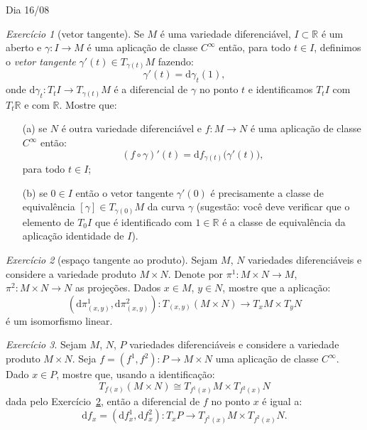 \documentclass[oneside,11pt]{amsart}
\newcommand{\R}{\mathds R}
\newcommand{\dd}{\mathrm d}
\theoremstyle{remark}\newtheorem{exercise}{Exercício}[section]
\theoremstyle{plain}\newtheorem{teo}{Teorema}[section]
\theoremstyle{plain}\newtheorem{lem}[teo]{Lema}
\theoremstyle{plain}\newtheorem{prop}[teo]{Proposição}
\theoremstyle{definition}\newtheorem{defin}[teo]{Definição}
\theoremstyle{remark}\newtheorem{rem}[teo]{Observação}
\theoremstyle{definition}\newtheorem{example}[teo]{Exemplo}
\numberwithin{equation}{section}
\begin{document}
\begin{section}{Dia 16/08}
\begin{exercise}[vetor tangente]
Se $M$ é uma variedade diferenciável, $I\subset\R$ é um aberto e $\gamma:I\to M$ é uma aplicação de classe $C^\infty$
então, para todo $t\in I$, definimos o {\em vetor tangente\/} $\gamma'(t)\in T_{\gamma(t)}M$ fazendo:
\[\gamma'(t)=\dd\gamma_t(1),\]
onde $\dd\gamma_t:T_tI\to T_{\gamma(t)}M$ é a diferencial de $\gamma$ no ponto $t$ e identificamos $T_tI$ com $T_t\R$ e
com $\R$. Mostre que:
\begin{itemize}
\item[(a)] se $N$ é outra variedade diferenciável e $f:M\to N$ é uma aplicação de classe $C^\infty$ então:
\[(f\circ\gamma)'(t)=\dd f_{\gamma(t)}\big(\gamma'(t)\big),\]
para todo $t\in I$;
\item[(b)] se $0\in I$ então o vetor tangente $\gamma'(0)$ é precisamente a classe de equivalência
$[\gamma]\in T_{\gamma(0)}M$ da curva $\gamma$ (sugestão: você deve verificar que o elemento de $T_0I$ que é identificado
com $1\in\R$ é a classe de equivalência da aplicação identidade de $I$).
\end{itemize}
\end{exercise}

\begin{exercise}[espaço tangente ao produto]\label{exe:esptanprod}
Sejam $M$, $N$ variedades diferenciáveis e considere a variedade produto $M\times N$. Denote por $\pi^1:M\times N\to M$,
$\pi^2:M\times N\to N$ as projeções. Dados $x\in M$, $y\in N$, mostre que a aplicação:
\[(\dd\pi^1_{(x,y)},\dd\pi^2_{(x,y)}):T_{(x,y)}(M\times N)\longrightarrow T_xM\times T_yN\]
é um isomorfismo linear.
\end{exercise}

\begin{exercise}
Sejam $M$, $N$, $P$ variedades diferenciáveis e considere a variedade produto $M\times N$. Seja $f=(f^1,f^2):P\longrightarrow M\times N$
uma aplicação de classe $C^\infty$. Dado $x\in P$, mostre que, usando a identificação:
\[T_{f(x)}(M\times N)\cong T_{f^1(x)}M\times T_{f^2(x)}N\]
dada pelo Exercício~\ref{exe:esptanprod}, então a diferencial de $f$ no ponto $x$ é igual a:
\[\dd f_x=(\dd f^1_x,\dd f^2_x):T_xP\longrightarrow T_{f^1(x)}M\times T_{f^2(x)}N.\]
\end{exercise}


\end{section}
\end{document}
